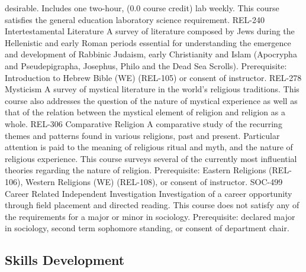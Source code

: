 \documentclass[
  letterpaper,
]{scrbook}
\begin{document}
desirable. Includes one two-hour, (0.0 course credit) lab weekly. This
course satisfies the general education laboratory science requirement.
REL-240 Intertestamental Literature A survey of literature composed by
Jews during the Hellenistic and early Roman periods essential for
understanding the emergence and development of Rabbinic Judaism, early
Christianity and Islam (Apocrypha and Pseudepigrapha, Josephus, Philo
and the Dead Sea Scrolls). Prerequisite: Introduction to Hebrew Bible
(WE) (REL-105) or consent of instructor. REL-278 Mysticism A survey of
mystical literature in the world's religious traditions. This course
also addresses the question of the nature of mystical experience as well
as that of the relation between the mystical element of religion and
religion as a whole. REL-306 Comparative Religion A comparative study of
the recurring themes and patterns found in various religions, past and
present. Particular attention is paid to the meaning of religious ritual
and myth, and the nature of religious experience. This course surveys
several of the currently most influential theories regarding the nature
of religion. Prerequisite: Eastern Religions (REL-106), Western
Religions (WE) (REL-108), or consent of instructor. SOC-499 Career
Related Independent Investigation Investigation of a career opportunity
through field placement and directed reading. This course does not
satisfy any of the requirements for a major or minor in sociology.
Prerequisite: declared major in sociology, second term sophomore
standing, or consent of department chair.

\hypertarget{skills-development}{%
\subsection{Skills Development}\label{skills-development}}
\end{document}
